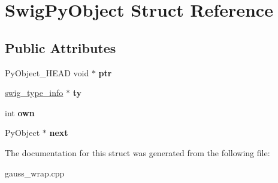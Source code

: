 \hypertarget{struct_swig_py_object}{\section{Swig\-Py\-Object Struct Reference}
\label{struct_swig_py_object}
}
\subsection*{Public Attributes}
\begin{DoxyCompactItemize}
\item 
\hypertarget{struct_swig_py_object_a41b1d569a8ba4fa9b1d87579c144891b}{Py\-Object\-\_\-\-H\-E\-A\-D void $\ast$ {\bfseries ptr}}\label{struct_swig_py_object_a41b1d569a8ba4fa9b1d87579c144891b}

\item 
\hypertarget{struct_swig_py_object_a510b5a6f66a8a33c0a54c3eeb83e5ba5}{\hyperlink{structswig__type__info}{swig\-\_\-type\-\_\-info} $\ast$ {\bfseries ty}}\label{struct_swig_py_object_a510b5a6f66a8a33c0a54c3eeb83e5ba5}

\item 
\hypertarget{struct_swig_py_object_a83cb6489fb1b171467f06c091ae6f283}{int {\bfseries own}}\label{struct_swig_py_object_a83cb6489fb1b171467f06c091ae6f283}

\item 
\hypertarget{struct_swig_py_object_af7b93d7ae49a6f3bdf6511043fe8e839}{Py\-Object $\ast$ {\bfseries next}}\label{struct_swig_py_object_af7b93d7ae49a6f3bdf6511043fe8e839}

\end{DoxyCompactItemize}


The documentation for this struct was generated from the following file\-:\begin{DoxyCompactItemize}
\item 
gauss\-\_\-wrap.\-cpp\end{DoxyCompactItemize}
